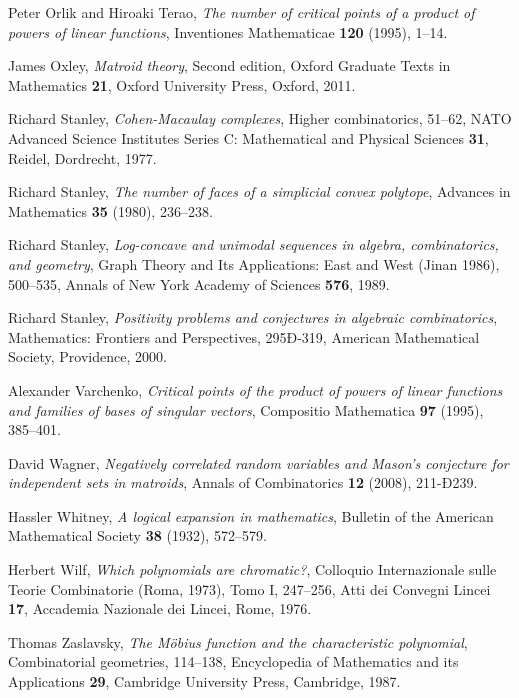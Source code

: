 \documentclass{compositio}
\theoremstyle{definition}
\theoremstyle{remark}
\begin{document}
\begin{thebibliography}{CDFV12}
 Peter Orlik and Hiroaki Terao, 
			\emph{The number of critical points of a product of powers of linear functions}, 
			Inventiones Mathematicae {\bf 120} (1995), 1--14.
						
 James Oxley, 
			\emph{Matroid theory},
			Second edition, Oxford Graduate Texts in Mathematics {\bf 21}, Oxford University Press, Oxford, 2011.


 Richard Stanley,
			\emph{Cohen-Macaulay complexes}, Higher combinatorics, 
			51--62, NATO Advanced Science Institutes Series C: Mathematical and Physical Sciences {\bf 31}, Reidel, Dordrecht, 1977. 

 Richard Stanley,
			\emph{The number of faces of a simplicial convex polytope},
			Advances in Mathematics {\bf 35} (1980), 236--238.
						
 Richard Stanley, 
			\emph{Log-concave and unimodal sequences in algebra, combinatorics, and geometry}, 
			Graph Theory and Its Applications: East and West (Jinan 1986), 500--535,
			Annals of New York Academy of Sciences {\bf 576}, 1989.
			
 Richard Stanley,
			\emph{Positivity problems and conjectures in algebraic combinatorics}, 
			Mathematics: Frontiers and Perspectives, 295Ð-319, American Mathematical Society, Providence, 2000. 

 Alexander Varchenko, 
			\emph{Critical points of the product of powers of linear functions and families of bases of singular vectors},
			 Compositio Mathematica {\bf 97} (1995), 385--401.
			 			
 David Wagner,
			\emph{Negatively correlated random variables and Mason's conjecture for independent sets in matroids}, 
			Annals of Combinatorics {\bf 12} (2008), 211-Ð239. 

			
 Hassler Whitney,
			\emph{A logical expansion in mathematics},
			Bulletin of the American Mathematical Society {\bf 38} (1932), 572--579.
			
 Herbert Wilf,
			\emph{Which polynomials are chromatic?},
			Colloquio Internazionale sulle Teorie Combinatorie (Roma, 1973), Tomo I, 247--256, 
			Atti dei Convegni Lincei {\bf 17}, 
			Accademia Nazionale dei Lincei, Rome, 1976. 

 Thomas Zaslavsky,
			\emph{The M\"obius function and the characteristic polynomial}, Combinatorial geometries, 114--138, 
			Encyclopedia of Mathematics and its Applications {\bf 29}, Cambridge University Press, Cambridge, 1987. 
			

\end{thebibliography}
\end{document}
